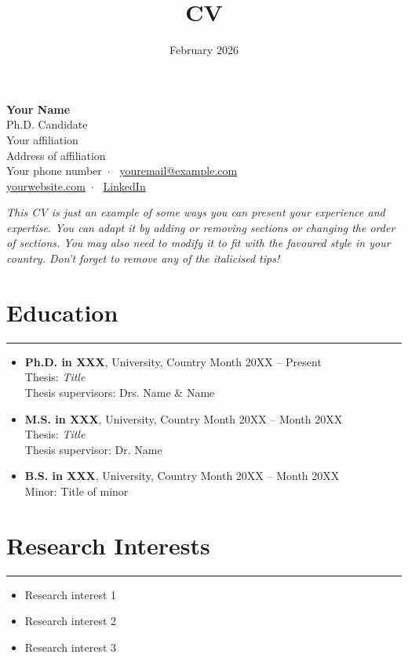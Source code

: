 \documentclass{article}
\title{CV}
\date{February 2026}
\makeatletter
\def\name{Your Name}
\def\position{Ph.D. Candidate}
\def\affiliation{Your affiliation}
\def\address{Address of affiliation}
\def\phone{Your phone number}
\def\email{\href{mailto:youremail@example.com}{youremail@example.com}}
\def\website{\href{https://yourwebsite.com}{yourwebsite.com}}
\def\LinkedIn{\href{https://www.linkedin.com/in/yourname}{LinkedIn}}
\makeatother
\begin{document}
\begin{center}
    {\huge \textbf{\name}}\\
    \vspace{0.2em}
    {\large \position}\\
    \affiliation\\
    \address\\
    \phone \, $\cdot$ \, \email\\
    \website \, $\cdot$ \, \LinkedIn
\end{center}

\noindent\textit{This CV is just an example of some ways you can present your experience and expertise. You can adapt it by adding or removing sections or changing the order of sections. You may also need to modify it to fit with the favoured style in your country. Don't forget to remove any of the italicised tips!}

\section*{Education}
\hrule
\vspace{1em}
\begin{itemize}[leftmargin=*]
    \item[] \textbf{Ph.D. in XXX}, University, Country \hfill Month 20XX -- Present\\
    Thesis: \textit{Title}\\
    Thesis supervisors: Drs. Name \& Name
    
    \item[] \textbf{M.S. in XXX}, University, Country \hfill Month 20XX -- Month 20XX\\
    Thesis: \textit{Title}\\
    Thesis supervisor: Dr. Name
    
    \item[] \textbf{B.S. in XXX}, University, Country \hfill Month 20XX -- Month 20XX\\
    Minor: Title of minor
\end{itemize}

\section*{Research Interests}
\hrule
\vspace{1em}
\begin{itemize}[leftmargin=2em]
    \item Research interest 1
    \item Research interest 2
    \item Research interest 3
\end{itemize}
\end{document}
